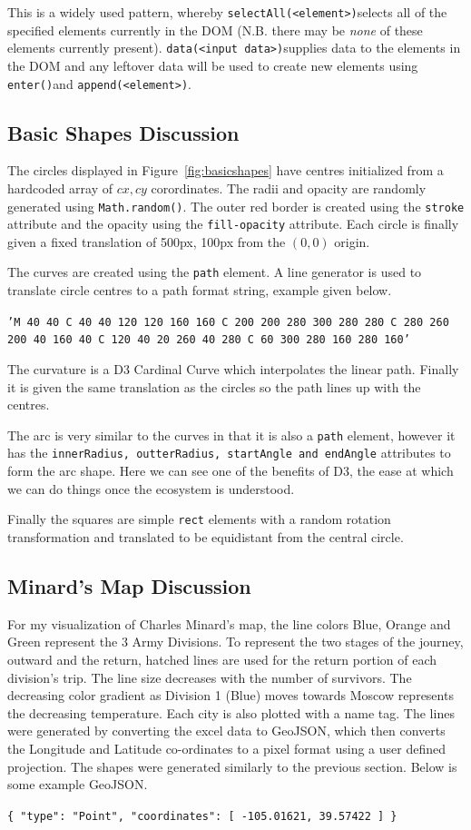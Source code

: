 \documentclass[12pt]{article}
\def\sa{\texttt{selectAll(\textless element\textgreater)}}
\def\data{\texttt{data(\textless input data\textgreater)}}
\def\app{\texttt{append(\textless element\textgreater)}}
\def\ent{\texttt{enter()}}
\begin{document}
This is a widely used pattern, whereby \sa  selects all of the specified elements currently in the DOM (N.B. there may be \textit{none} of these elements currently
present). \data supplies data to the elements in the DOM and any leftover data will be used to create new elements
using \ent and \app.
\subsection{Basic Shapes Discussion}
The circles displayed in Figure~\ref{fig:basicshapes} have centres initialized from a hardcoded array of $cx, cy$ corordinates. The radii and opacity are randomly generated using
\texttt{Math.random()}. The outer red border is created using the \texttt{stroke} attribute and the opacity using the \texttt{fill-opacity} attribute. Each circle is
finally given a fixed translation of 500px, 100px from the $(0, 0)$ origin. 

The curves are created using the \texttt{path} element. A line generator is used to translate circle centres to a path format string, example given below.
\begin{center}
    \texttt{'M 40 40 C 40 40 120 120 160 160 C 200 200 280 300 280 280 C 280 260 200 40 160 40 C 120 40 20 260 40 280 C 60 300 280 160 280 160'}
\end{center}

The curvature is a D3 Cardinal Curve which interpolates the linear path. Finally it is given the same translation as the circles so the path lines up with the centres.  

The arc is very similar to the curves in that it is also a \texttt{path} element, however it has the \texttt{innerRadius, outterRadius, startAngle and endAngle}
attributes to form the arc shape. Here we can see one of the benefits of D3, the ease at which we can do things once the ecosystem is understood.  

Finally the squares are simple \texttt{rect} elements with a random rotation transformation and translated to be equidistant from the central circle.
\subsection{Minard's Map Discussion}
For my visualization of Charles Minard's map, the line colors Blue, Orange and Green represent the 3 Army Divisions. To represent the two stages of the journey, outward
and the return, hatched lines are used for the return portion of each division's trip. The line size decreases with the number of survivors. The decreasing color gradient
as Division 1 (Blue) moves towards Moscow represents the decreasing temperature. Each city is also plotted with a name tag. The lines were generated by converting the
excel data to GeoJSON, which then converts the Longitude and Latitude co-ordinates to a pixel format using a user defined projection. The shapes were generated similarly
to the previous section. Below is some example GeoJSON.
\begin{center}
    \texttt{\{ "type": "Point", "coordinates": [ -105.01621, 39.57422 ] \}}
\end{center}
\end{document}
